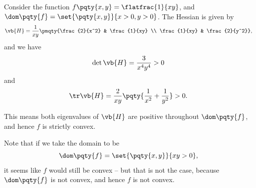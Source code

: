\begin{example}
    Consider the function \(f\pqty{x, y} = \flatfrac{1}{xy}\), and \(\dom\pqty{f} = \set{\pqty{x, y}}{x > 0, y > 0}\). The Hessian is given by
    \[
        \vb{H} = \frac{1}{xy} \pmqty{\frac{2}{x^2} & \frac{1}{xy} \\ \frac{1}{xy} & \frac{2}{y^2}},
    \]
    and we have
    \[
        \det \vb{H} = \frac{3}{x^4 y^4} > 0
    \]
    and
    \[
        \tr \vb{H} = \frac{2}{xy} \pqty{\frac{1}{x^2} + \frac{1}{y^2}} > 0.
    \]

    This means both eigenvalues of \(\vb{H}\) are positive throughout \(\dom\pqty{f}\), and hence \(f\) is strictly convex.

    Note that if we take the domain to be
    \[
        \dom\pqty{f} = \set{\pqty{x, y}}{xy > 0},
    \]
    it seems like \(f\) would still be convex -- but that is not the case, because \(\dom \pqty{f}\) is not convex, and hence \(f\) is not convex.
\end{example}